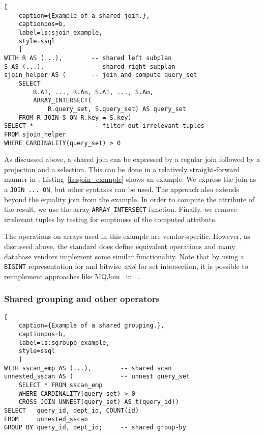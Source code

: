 \begin{lstlisting}[
    caption={Example of a shared join.},
    captionpos=b,
    label=ls:sjoin_example,
    style=ssql
    ]
WITH R AS (...),        -- shared left subplan
S AS (...),             -- shared right subplan
sjoin_helper AS (       -- join and compute query_set
    SELECT
        R.A1, ..., R.An, S.A1, ..., S.Am,
        ARRAY_INTERSECT(
            R.query_set, S.query_set) AS query_set
    FROM R JOIN S ON R.key = S.key)
SELECT *                -- filter out irrelevant tuples
FROM sjoin_helper  
WHERE CARDINALITY(query_set) > 0
\end{lstlisting}

As discussed above, a shared join can be expressed by a regular join followed by
a projection and a selection.  This can be done in a relatively straight-forward
manner in \sql.  Listing~\ref{ls:sjoin_example} shows an example.  We express
the join as a \lstinline[style=sql]{JOIN ... ON}, but other syntaxes can be
used.  The approach also extends beyond the equality join from the example.  In
order to compute the \qset attribute of the result, we use the array
\lstinline[style=sql]{ARRAY_INTERSECT} function.  Finally, we remove irrelevant
tuples by testing for emptiness of the computed \qset attribute.

The operations on arrays used in this example are vendor-specific.
However, as discussed above, the standard does define equivalent operations
and many database vendors implement some similar functionality.
Note that by using a \lstinline[style=sql]{BIGINT} representation
for \qset and bitwise $\varname{and}$ for set intersection,
it is possible to reimplement approaches like MQJoin~\cite{mqjoin} in \sql~\cite{Wolf2017}.

\subsubsection{Shared grouping and other operators}

\begin{lstlisting}[
    caption={Example of a shared grouping.},
    captionpos=b,
    label=ls:sgroupb_example,
    style=ssql
    ]
WITH sscan_emp AS (...),        -- shared scan
unnested_sscan AS (             -- unnest query_set
    SELECT * FROM sscan_emp
    WHERE CARDINALITY(query_set) > 0
    CROSS JOIN UNNEST(query_set) AS t(query_id))
SELECT   query_id, dept_id, COUNT(id) 
FROM     unnested_sscan
GROUP BY query_id, dept_id;     -- shared group-by
\end{lstlisting}

